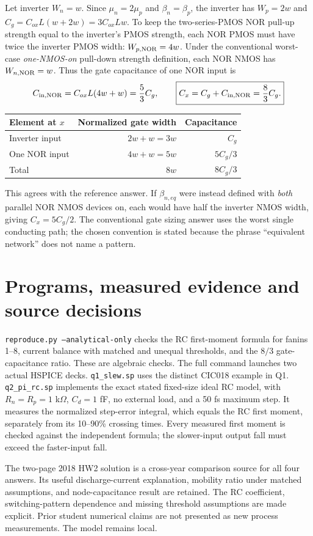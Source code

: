 \documentclass[11pt,a4paper]{article}
\begin{document}
Let inverter $W_n=w$. Since $\mu_n=2\mu_p$ and $\beta_n=\beta_p$,
the inverter has $W_p=2w$ and
$C_g=C_{ox}L(w+2w)=3C_{ox}Lw$.
To keep the two-series-PMOS NOR pull-up strength equal to the inverter's
PMOS strength, each NOR PMOS must have twice the inverter PMOS width:
$W_{p,\rm NOR}=4w$. Under the conventional worst-case \emph{one-NMOS-on}
pull-down strength definition, each NOR NMOS has $W_{n,\rm NOR}=w$.
Thus the gate capacitance of one NOR input is
\[
 C_{\rm in,NOR}=C_{ox}L(4w+w)=\frac53C_g,
 \qquad \boxed{C_x=C_g+C_{\rm in,NOR}=\frac83C_g.}
\]
\begin{center}\begin{tabular}{lrr}
\toprule Element at $x$&Normalized gate width&Capacitance\\\midrule
Inverter input&$2w+w=3w$&$C_g$\\
One NOR input&$4w+w=5w$&$5C_g/3$\\
Total&$8w$&$8C_g/3$\\\bottomrule
\end{tabular}\end{center}
This agrees with the reference answer. If $\beta_{n,eq}$ were instead
defined with \emph{both} parallel NOR NMOS devices on, each would have
half the inverter NMOS width, giving $C_x=5C_g/2$. The conventional gate
sizing answer uses the worst single conducting path; the chosen convention
is stated because the phrase ``equivalent network'' does not name a pattern.

\section*{Programs, measured evidence and source decisions}
\texttt{reproduce.py --analytical-only} checks the RC first-moment formula
for fanins 1--8, current balance with matched and unequal thresholds, and
the $8/3$ gate-capacitance ratio. These are algebraic checks.
The full command launches two actual HSPICE decks. \texttt{q1\_slew.sp}
uses the distinct CIC018 example in Q1. \texttt{q2\_pi\_rc.sp} implements
the exact stated fixed-size ideal RC model, with $R_n=R_p=1$ k$\Omega$,
$C_d=1$ fF, no external load, and a 50 fs maximum step.
It measures the normalized step-error integral, which equals the RC
first moment, separately from its 10--90\% crossing times.
Every measured first moment is checked against the independent formula;
the slower-input output fall must exceed the faster-input fall.

The two-page 2018 HW2 solution is a cross-year comparison source for all
four answers. Its useful discharge-current explanation, mobility ratio
under matched assumptions, and node-capacitance result are retained.
The RC coefficient, switching-pattern dependence and missing threshold
assumptions are made explicit. Prior student numerical claims are not
presented as new process measurements. The model remains local.
\end{document}
